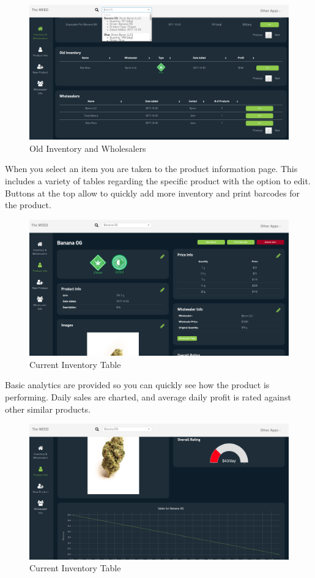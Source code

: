 \documentclass[]{book}
\theoremstyle{definition}
\theoremstyle{definition}
\theoremstyle{definition}
\theoremstyle{remark}
\begin{document}
\begin{figure}
\centering
\includegraphics{images/inventory2.png}
\caption{Old Inventory and Wholesalers}
\end{figure}

When you select an item you are taken to the product information page.
This includes a variety of tables regarding the specific product with
the option to edit. Buttons at the top allow to quickly add more
inventory and print barcodes for the product.

\begin{figure}
\centering
\includegraphics{images/productInfo.png}
\caption{Current Inventory Table}
\end{figure}

Basic analytics are provided so you can quickly see how the product is
performing. Daily sales are charted, and average daily profit is rated
against other similar products.

\begin{figure}
\centering
\includegraphics{images/productInfo2.png}
\caption{Current Inventory Table}
\end{figure}
\end{document}
